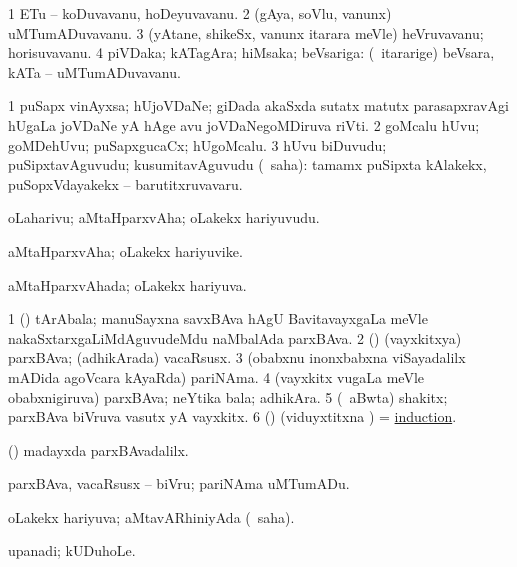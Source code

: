 \bentry
{}
\gl{\nA}
\bmng
\bnum
\num{1} ETu -- koDuvavanu, hoDeyuvavanu. 
\num{2} (gAya, soVlu, \mo vanunx) uMTumADuvavanu. 
\num{3} (yAtane, shikeSx, \mo vanunx itarara meVle) heVruvavanu; horisuvavanu. 
\num{4} piVDaka; kATagAra; hiMsaka; beVsariga: (\kanmu\ itararige) beVsara, kATa -- uMTumADuvavanu. 
\enum
\emng
\eentry

\bentry
{}
\gl{\nA}
\bmng
\bnum
\num{1} puSapx vinAyxsa; hUjoVDaNe; giDada akaSxda sutatx matutx parasapxravAgi hUgaLa joVDaNe yA hAge avu joVDaNegoMDiruva riVti. 
\num{2} goMcalu hUvu; goMDehUvu; puSapxgucaCx; hUgoMcalu. 
\num{3} hUvu biDuvudu; puSipxtavAguvudu; kusumitavAguvudu (\rUpa\ saha):  tamamx puSipxta kAlakekx, puSopxVdayakekx -- barutitxruvavaru. 
\enum
\emng
\eentry

\bentry
{}
\gl{\nA}
\bmng
oLaharivu; aMtaHparxvAha; oLakekx hariyuvudu. 
\emng
\eentry

\bentry
{}
\gl{\nA}
\bmng
aMtaHparxvAha; oLakekx hariyuvike. 
\emng
\eentry

\bentry
{}
\gl{\gu}
\bmng
aMtaHparxvAhada; oLakekx hariyuva. 
\emng
\eentry

\bentry
{}
\gl{\nA}
\bmng
\bnum
\num{1} (\joyxV) tArAbala; manuSayxna savxBAva hAgU BavitavayxgaLa meVle nakaSxtarxgaLiMdAguvudeMdu naMbalAda parxBAva. 
\num{2} (\rUpa) (vayxkitxya) parxBAva; (adhikArada) vacaRsusx. 
\num{3} (obabxnu inonxbabxna viSayadalilx mADida agoVcara kAyaRda) pariNAma. 
\num{4} (vayxkitx \mo vugaLa meVle obabxnigiruva) parxBAva; neYtika bala; adhikAra. 
\num{5} (\sA\ aBwta) shakitx; parxBAva biVruva vasutx yA vayxkitx. 
\num{6} (\pArxparx) (viduyxtitxna \vi)  = \hyperlink{induction}{induction}. 
\enum
\emng

\noindent
\gl{\pagu}
\bmng
{} (\AmA) madayxda parxBAvadalilx. 
\emng
\eentry

\bentry
{}
\gl{\sakirx}
\bmng
parxBAva, vacaRsusx -- biVru; pariNAma uMTumADu. 
\emng
\eentry

\bentry
{}
\gl{\gu}
\bmng
oLakekx hariyuva; aMtavARhiniyAda (\rUpa\ saha). 
\emng
\eentry

\bentry
{}
\gl{\nA}
\bmng
upanadi; kUDuhoLe. 
\emng
\eentry

